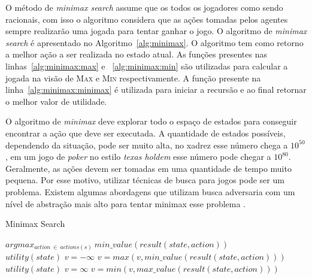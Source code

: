 O método de \textit{minimax search} assume que os todos os jogadores como sendo racionais, com isso o algoritmo considera que as ações tomadas pelos agentes sempre realizarão uma jogada para tentar ganhar o jogo. O algoritmo de \textit{minimax search} é apresentado no Algoritmo~\ref{alg:minimax}. O algoritmo tem como retorno a melhor ação a ser realizada no estado atual. As funções presentes nas linhas~\ref{alg:minimax:max} e ~\ref{alg:minimax:min} são utilizadas para calcular a jogada na visão de \textsc{Max} e \textsc{Min} respectivamente.
A função presente na linha~\ref{alg:minimax:minimax} é utilizada para iniciar a recursão e ao final retornar o melhor valor de utilidade.

O algoritmo de \textit{minimax} deve explorar todo o espaço de estados para conseguir encontrar a ação que deve ser executada. A quantidade de estados possíveis, dependendo da situação, pode ser muito alta, no xadrez esse número chega a $10^{50}$, em um jogo de \textit{poker} no estilo \textit{texas holdem} esse número pode chegar a $10^{80}$. Geralmente, as ações devem ser tomadas em uma quantidade de tempo muito pequena. Por esse motivo, utilizar técnicas de busca para jogos pode ser um problema. Existem algumas abordagens que utilizam busca adversaria com um nível de abstração mais alto para tentar minimax esse problema \cite{ontanon2013survey}.  

\begin{algorithm}
	\caption{Minimax Search}
	\label{alg:minimax}
	\begin{algorithmic}[1]	
		 \label{alg:minimax:minimax}
		\State \Return $arg max_{action~ \in~ actions(s)}~ min\_value(result(state,  action)) $
		\EndFunction \\
		\label{alg:minimax:max}
		\State	\Return $utility(state)$
		\EndIf
		\State $v = -\infty$
		\State $v = max(v, min\_value(result(state,action)))$
		\EndFor	
		\EndFunction \\
		\label{alg:minimax:min}
		\State	\Return $utility(state)$
		\EndIf
		\State $v = \infty$
		\State $v = min(v, max\_value(result(state,action)))$
		\EndFor	
		\EndFunction
	\end{algorithmic}
\end{algorithm}



